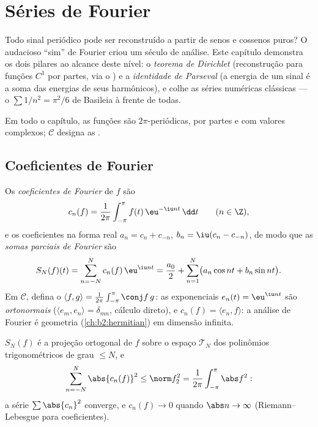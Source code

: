 \chapter{Séries de Fourier}\label{ch:b2:fourier}

Todo sinal periódico pode ser reconstruído a partir de senos e cossenos puros?
O audacioso ``sim'' de Fourier criou um século de análise. Este
capítulo demonstra os dois pilares ao alcance deste nível:
o \emph{teorema de Dirichlet} (reconstrução  para funções $C^1$ por partes,
via o ) e a \emph{identidade de Parseval} (a energia
de um sinal é a soma das energias de seus harmônicos), e
colhe as séries numéricas clássicas --- o $\sum 1/n^2 =
\pi^2/6$ de Basileia à frente de todas.

Em todo o capítulo, as funções são $2\pi$-periódicas,  por partes
e com valores complexos; $\mathcal{C}$ designa as .

\section{Coeficientes de Fourier}

\begin{definition}\label{def:b2:fourier:coefficients}
Os \emph{coeficientes de Fourier} de $f$
são
\[
c_n(f) = \frac{1}{2\pi}\int_{-\pi}^{\pi} f(t)\,\eu^{-\iu n t}\,\dd
t \qquad (n \in \Z),
\]
e os coeficientes na forma real $a_n = c_n + c_{-n}$, $b_n = \iu(c_n
- c_{-n})$, de modo que as \emph{somas parciais de Fourier} são
\[
S_N(f)(t) = \sum_{n=-N}^{N} c_n(f)\,\eu^{\iu nt}
= \frac{a_0}{2} + \sum_{n=1}^{N}\bigl(a_n\cos nt + b_n \sin
nt\bigr).
\]
Em $\mathcal{C}$, defina o  $\langle f,
g\rangle = \frac{1}{2\pi}\int_{-\pi}^{\pi}\conj f\,g$: as
exponenciais $e_n(t) = \eu^{\iu nt}$ são \emph{ortonormais}
($\langle e_m, e_n\rangle = \delta_{mn}$, cálculo direto), e
$c_n(f) = \langle e_n, f\rangle$: a análise de Fourier é geometria
 (\cref{ch:b2:hermitian}) em dimensão infinita.
\end{definition}

\begin{proposition}\label{prop:b2:fourier:bessel}
$S_N(f)$ é a projeção ortogonal de $f$ sobre o espaço
$\mathcal{T}_N$ dos polinômios trigonométricos de grau $\leq N$,
e
\[
\sum_{n=-N}^{N} \abs{c_n(f)}^2 \leq \norm f_2^2 =
\frac{1}{2\pi}\int_{-\pi}^{\pi} \abs f^2 :
\]
a série $\sum \abs{c_n}^2$ converge, e $c_n(f) \to 0$ quando
$\abs n \to \infty$ (Riemann--Lebesgue para coeficientes).
\end{proposition}


